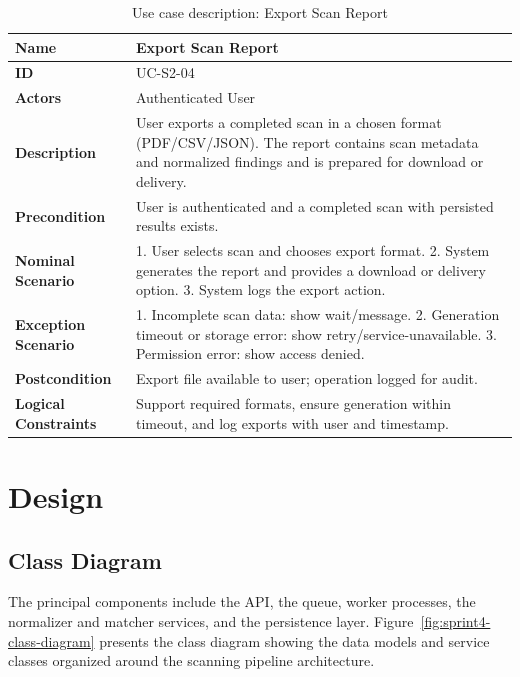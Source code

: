 \begin{table}[H]
    \centering
    \caption{Use case description: Export Scan Report}
    \label{tab:scan-export-usecase}
    \renewcommand{\arraystretch}{1.4}
    \small
    \begin{tabularx}{\textwidth}{|p{2.5cm}|X|}
        \hline
        \textbf{Name} & Export Scan Report \\\hline
        \textbf{ID} & UC-S2-04 \\\hline
        \textbf{Actors} & Authenticated User \\\hline
        \textbf{Description} & User exports a completed scan in a chosen format (PDF/CSV/JSON). The report contains scan metadata and normalized findings and is prepared for download or delivery. \\\hline
        \textbf{Precondition} & User is authenticated and a completed scan with persisted results exists. \\\hline
        \textbf{Nominal Scenario} & 1. User selects scan and chooses export format. 2. System generates the report and provides a download or delivery option. 3. System logs the export action. \\\hline
        \textbf{Exception Scenario} & 1. Incomplete scan data: show wait/message. 2. Generation timeout or storage error: show retry/service-unavailable. 3. Permission error: show access denied. \\\hline
        \textbf{Postcondition} & Export file available to user; operation logged for audit. \\\hline
        \textbf{Logical Constraints} & Support required formats, ensure generation within timeout, and log exports with user and timestamp. \\\hline
    \end{tabularx}
\end{table}

\section{Design}

\subsection{Class Diagram}

The principal components include the API, the queue, worker processes, the normalizer and matcher services, and the persistence layer. Figure~\ref{fig:sprint4-class-diagram} presents the class diagram showing the data models and service classes organized around the scanning pipeline architecture.

